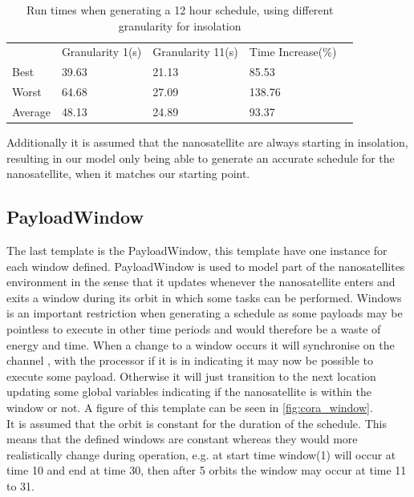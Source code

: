 \begin{table}[H]
	\centering
	\begin{tabular}{lllll}
		& Granularity 1(s)           & Granularity 11(s)          & Time Increase(\%)           &  \\ \cline{2-4}
		\multicolumn{1}{l|}{Best}    & \multicolumn{1}{l|}{39.63} & \multicolumn{1}{l|}{21.13} & \multicolumn{1}{l|}{85.53}  &  \\
		\multicolumn{1}{l|}{Worst}   & \multicolumn{1}{l|}{64.68} & \multicolumn{1}{l|}{27.09} & \multicolumn{1}{l|}{138.76} &  \\
		\multicolumn{1}{l|}{Average} & \multicolumn{1}{l|}{48.13} & \multicolumn{1}{l|}{24.89} & \multicolumn{1}{l|}{93.37}  &  \\ \cline{2-4}
	\end{tabular}
		\caption{Run times when generating a 12 hour schedule, using different granularity for insolation}
		\label{tab:runTimes}
\end{table}
		
Additionally it is assumed that the nanosatellite are always starting in insolation, resulting in our model only being able to generate an accurate schedule for the nanosatellite, when it matches our starting point.


\subsection*{PayloadWindow}\label{ssec:cora_tw}
The last template is the PayloadWindow, this template have one instance for each window defined. PayloadWindow is used to model part of the nanosatellites environment in the sense that it updates whenever the nanosatellite enters and exits a window during its orbit in which some tasks can be performed. Windows is an important restriction when generating a schedule as some payloads may be pointless to execute in other time periods and would therefore be a waste of energy and time. When a change to a window occurs it will synchronise on the channel , with the processor if it is in  indicating it may now be possible to execute some payload. Otherwise it will just transition to the next location updating some global variables indicating if the nanosatellite is within the window or not. 
A figure of this template can be seen in \cref{fig:cora_window}.\\
It is assumed that the orbit is constant for the duration of the schedule. This means that the defined windows are constant whereas they would more realistically change during operation, e.g. at start time window(1) will occur at time 10 and end at time 30, then after 5 orbits the window may occur at time 11 to 31.

